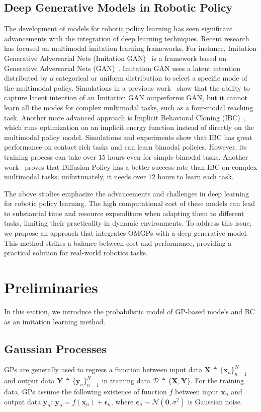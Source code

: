 \documentclass[sn-mathphys-num]{sn-jnl}
\begin{document}
\subsection{Deep Generative Models in Robotic Policy}
The development of models for robotic policy learning has seen significant advancements with the integration of deep learning techniques. Recent research has focused on multimodal imitation learning frameworks. For instance, Imitation Generative Adversarial Nets (Imitation GAN)~\cite{hausman2017multi} is a framework based on Generative Adversarial Nets (GAN)~\cite{creswell2018generative}. Imitation GAN uses a latent intention distributed by a categorical or uniform distribution to select a specific mode of the multimodal policy.
Simulations in a previous work~\cite{hausman2017multi} show that the ability to capture latent intention of an Imitation GAN outperforms GAN, but it cannot learn all the modes for complex multimodal tasks, such as a four-modal reaching task.
Another more advanced approach is Implicit Behavioral Cloning (IBC)~\cite{florence2022implicit}, which runs optimization on an implicit energy function instead of directly on the multimodal policy model. 
Simulations and experiments show that IBC has great performance on contact rich tasks and can learn bimodal policies. 
However, its training process can take over 15 hours even for simple bimodal tasks.
Another work~\cite{chi2023diffusion} proves that Diffusion Policy has a better success rate than IBC on complex multimodal tasks; unfortunately, it needs over 12 hours to learn each task.


The above studies emphasize the advancements and challenges in deep learning for robotic policy learning. The high computational cost of these models can lead to substantial time and resource expenditure when adapting them to different tasks, limiting their practicality in dynamic environments. To address this issue, we propose an approach that integrates OMGPs with a deep generative model. This method strikes a balance between cost and performance, providing a practical solution for real-world robotics tasks.



\section{Preliminaries}\label{section 3}
In this section, we introduce the probabilistic model of GP-based models and BC as an imitation learning method.

\subsection{Gaussian Processes}
GPs are generally used to regress a function between input data $\mathbf{X}\triangleq\{\mathbf{x}_{n}\}_{n=1}^{N}$ and output data $\mathbf{Y}\triangleq\{\mathbf{y}_{n}\}_{n=1}^{N}$ in training data $\mathcal{D}\triangleq \{\mathbf{X}, \mathbf{Y}\}$.
For the training data, GPs assume the following existence of function $f$ between input $\mathbf x_n$ and output data $\mathbf y_n$: $\mathbf{y}_n=f(\mathbf{x}_n)+\boldsymbol{\epsilon}_n$, where $\boldsymbol{\epsilon}_n \sim \mathcal{N}(\mathbf{0}, \sigma^2)$ is Gaussian noise.
\end{document}
